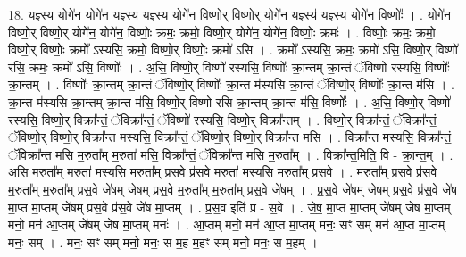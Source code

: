 \documentclass[17pt]{extarticle}
\begin{document}
18. य॒ज्ञ्स्य॒ योगे॑न॒ योगे॑न य॒ज्ञ्स्य॑ य॒ज्ञ्स्य॒ योगे॑न॒ विष्णो॒र् विष्णो॒र् योगे॑न य॒ज्ञ्स्य॑ य॒ज्ञ्स्य॒ योगे॑न॒ विष्णोः᳚ । . योगे॑न॒ विष्णो॒र् विष्णो॒र् योगे॑न॒ योगे॑न॒ विष्णोः॒ क्रमः॒ क्रमो॒ विष्णो॒र् योगे॑न॒ योगे॑न॒ विष्णोः॒ क्रमः॑ । . विष्णोः॒ क्रमः॒ क्रमो॒ विष्णो॒र् विष्णोः॒ क्रमो᳚ ऽस्यसि॒ क्रमो॒ विष्णो॒र् विष्णोः॒ क्रमो॑ ऽसि । . क्रमो᳚ ऽस्यसि॒ क्रमः॒ क्रमो॑ ऽसि॒ विष्णो॒र् विष्णो॑ रसि॒ क्रमः॒ क्रमो॑ ऽसि॒ विष्णोः᳚ । . अ॒सि॒ विष्णो॒र् विष्णो॑ रस्यसि॒ विष्णोः᳚ क्रा॒न्तम् क्रा॒न्तं ॅविष्णो॑ रस्यसि॒ विष्णोः᳚ क्रा॒न्तम् । . विष्णोः᳚ क्रा॒न्तम् क्रा॒न्तं ॅविष्णो॒र् विष्णोः᳚ क्रा॒न्त म॑स्यसि क्रा॒न्तं ॅविष्णो॒र् विष्णोः᳚ क्रा॒न्त म॑सि । . क्रा॒न्त म॑स्यसि क्रा॒न्तम् क्रा॒न्त म॑सि॒ विष्णो॒र् विष्णो॑ रसि क्रा॒न्तम् क्रा॒न्त म॑सि॒ विष्णोः᳚ । . अ॒सि॒ विष्णो॒र् विष्णो॑ रस्यसि॒ विष्णो॒र् विक्रा᳚न्तं॒ ॅविक्रा᳚न्तं॒ ॅविष्णो॑ रस्यसि॒ विष्णो॒र् विक्रा᳚न्तम् । . विष्णो॒र् विक्रा᳚न्तं॒ ॅविक्रा᳚न्तं॒ ॅविष्णो॒र् विष्णो॒र् विक्रा᳚न्त मस्यसि॒ विक्रा᳚न्तं॒ ॅविष्णो॒र् विष्णो॒र् विक्रा᳚न्त मसि । . विक्रा᳚न्त मस्यसि॒ विक्रा᳚न्तं॒ ॅविक्रा᳚न्त मसि म॒रुता᳚म् म॒रुता॑ मसि॒ विक्रा᳚न्तं॒ ॅविक्रा᳚न्त मसि म॒रुता᳚म् । . विक्रा᳚न्त॒मिति॒ वि - क्रा॒न्त॒म् । . अ॒सि॒ म॒रुता᳚म् म॒रुता॑ मस्यसि म॒रुता᳚म् प्रस॒वे प्र॑स॒वे म॒रुता॑ मस्यसि म॒रुता᳚म् प्रस॒वे । . म॒रुता᳚म् प्रस॒वे प्र॑स॒वे म॒रुता᳚म् म॒रुता᳚म् प्रस॒वे जे॑षम् जेषम् प्रस॒वे म॒रुता᳚म् म॒रुता᳚म् प्रस॒वे जे॑षम् । . प्र॒स॒वे जे॑षम् जेषम् प्रस॒वे प्र॑स॒वे जे॑ष मा॒प्त मा॒प्तम् जे॑षम् प्रस॒वे प्र॑स॒वे जे॑ष मा॒प्तम् । . प्र॒स॒व इति॑ प्र - स॒वे । . जे॒ष॒ मा॒प्त मा॒प्तम् जे॑षम् जेष मा॒प्तम् मनो॒ मन॑ आ॒प्तम् जे॑षम् जेष मा॒प्तम् मनः॑ । . आ॒प्तम् मनो॒ मन॑ आ॒प्त मा॒प्तम् मनः॒ सꣳ सम् मन॑ आ॒प्त मा॒प्तम् मनः॒ सम् । . मनः॒ सꣳ सम् मनो॒ मनः॒ स म॒ह म॒हꣳ सम् मनो॒ मनः॒ स म॒हम् । \newline
\end{document}
